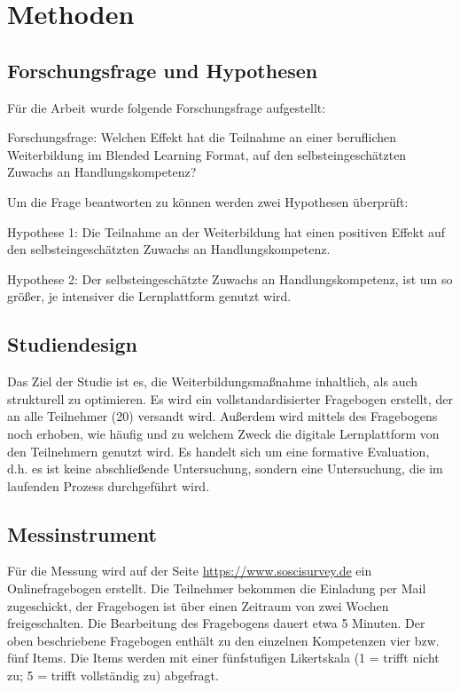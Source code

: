 \documentclass[12pt,smallheadings, bibliography=totoc]{scrartcl}
\begin{document}
\section{Methoden}\label{methoden}

\subsection{Forschungsfrage und
Hypothesen}\label{forschungsfrage-und-hypothesen}

\label{sec:FF} Für die Arbeit wurde folgende Forschungsfrage
aufgestellt:

\begin{framed}
Forschungsfrage: Welchen Effekt hat die Teilnahme an einer beruflichen Weiterbildung im Blended Learning Format, auf den selbsteingeschätzten Zuwachs an Handlungskompetenz?
\end{framed}

Um die Frage beantworten zu können werden zwei Hypothesen überprüft:

\begin{framed}
Hypothese 1: Die Teilnahme an der Weiterbildung hat einen positiven Effekt auf den selbsteingeschätzten Zuwachs an Handlungskompetenz.

 Hypothese 2: Der selbsteingeschätzte Zuwachs an Handlungskompetenz, ist um so größer, je intensiver die Lernplattform genutzt wird.
 \end{framed}

\subsection{Studiendesign}\label{studiendesign}

Das Ziel der Studie ist es, die Weiterbildungsmaßnahme inhaltlich, als
auch strukturell zu optimieren. Es wird ein vollstandardisierter
Fragebogen erstellt, der an alle Teilnehmer (20) versandt wird. Außerdem
wird mittels des Fragebogens noch erhoben, wie häufig und zu welchem
Zweck die digitale Lernplattform von den Teilnehmern genutzt wird. Es
handelt sich um eine formative Evaluation, d.h. es ist keine
abschließende Untersuchung, sondern eine Untersuchung, die im laufenden
Prozess durchgeführt wird.

\subsection{Messinstrument}\label{messinstrument}

Für die Messung wird auf der Seite \url{https://www.soscisurvey.de} ein
Onlinefragebogen erstellt. Die Teilnehmer bekommen die Einladung per
Mail zugeschickt, der Fragebogen ist über einen Zeitraum von zwei Wochen
freigeschalten. Die Bearbeitung des Fragebogens dauert etwa 5 Minuten.
Der oben beschriebene Fragebogen enthält zu den einzelnen Kompetenzen
vier bzw. fünf Items. Die Items werden mit einer fünfstufigen
Likertskala (1 = trifft nicht zu; 5 = trifft vollständig zu) abgefragt.
\end{document}

